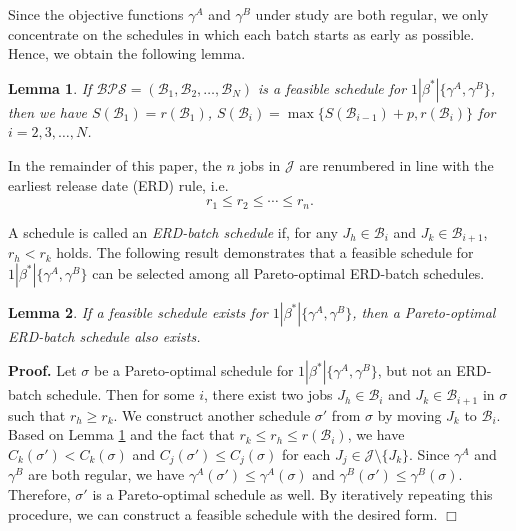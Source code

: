 \documentclass[12pt]{article}
\newtheorem{lemma}{Lemma}[section]
\begin{document}
\begin{sloppypar}
Since the objective functions $\gamma^A$ and $\gamma^B$ under study are both regular, we only concentrate on the schedules in which each batch starts as early as possible. Hence, we obtain the following lemma.

\begin{lemma} \label{L-2.1}
If $\mathcal{BPS}=(\mathcal{B}_1, \mathcal{B}_2, \ldots, \mathcal{B}_N)$ is a feasible schedule for $1 | \beta^{*} |\{\gamma^A, \gamma^B\}$, then we have $S(\mathcal{B}_1)=r(\mathcal{B}_1)$, $S(\mathcal{B}_i)=\max \{S(\mathcal{B}_{i-1})+p, r(\mathcal{B}_i)\}$ for $i=2, 3, \ldots, N$.
\end{lemma}

In the remainder of this paper, the $n$ jobs in $\mathcal{J}$ are renumbered in line with the earliest release date (ERD) rule, i.e.
\begin{equation}\label{E-2.1}
r_1 \leq r_2 \leq \cdots \leq r_n.
\end{equation}

A schedule is called an \emph{ERD-batch schedule} if, for any $J_h \in \mathcal{B}_i$ and $J_k \in \mathcal{B}_{i+1}$, $r_h < r_k$ holds. The following result demonstrates that a feasible schedule for $1 | \beta^{*} |\{\gamma^A, \gamma^B\}$ can be selected among all Pareto-optimal ERD-batch schedules.

\begin{lemma} \label{L-2.2}
If a feasible schedule exists for $1 | \beta^{*} |\{\gamma^A, \gamma^B\}$, then a Pareto-optimal ERD-batch schedule also exists.
\end{lemma}

\noindent \textbf{Proof.} Let $\sigma$ be a Pareto-optimal schedule for $1 | \beta^{*} |\{\gamma^A, \gamma^B\}$, but not an ERD-batch schedule. Then for some $i$, there exist two jobs $J_h \in \mathcal{B}_i$ and $J_k \in \mathcal{B}_{i+1}$ in $\sigma$ such that $r_h \geq r_k$. We construct another schedule $\sigma'$ from  $\sigma$ by moving $J_k$ to $\mathcal{B}_i$.
Based on Lemma \ref{L-2.1} and the fact that $r_k \leq r_h \leq r(\mathcal{B}_i)$, we have $C_k(\sigma') < C_k(\sigma)$ and $C_j(\sigma') \leq C_j(\sigma)$ for each $J_j \in \mathcal{J} \setminus \{J_k\}$. Since $\gamma^A$ and $\gamma^B$ are
both regular, we have $\gamma^A(\sigma') \leq \gamma^A(\sigma)$ and $\gamma^B(\sigma') \leq \gamma^B(\sigma)$. Therefore, $\sigma'$ is a Pareto-optimal schedule as well. By iteratively repeating this procedure, we can construct a feasible schedule with the desired form. \hfill$\Box$\\


\end{sloppypar}
\end{document}
